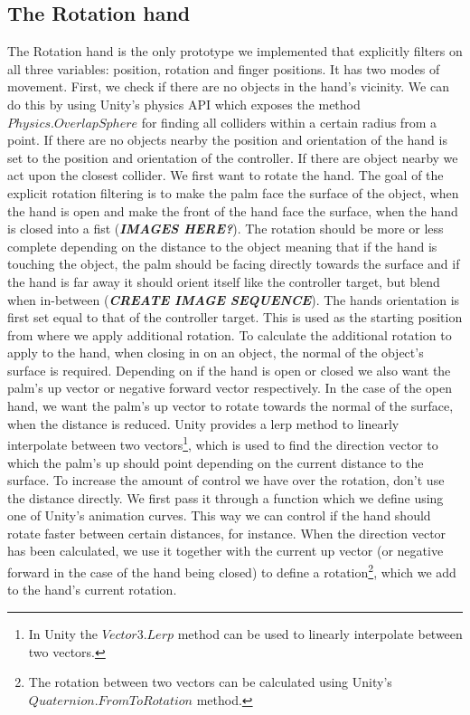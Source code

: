 
\subsection{The Rotation hand}
\label{subsec:slidingRigidHand}
The Rotation hand is the only prototype we implemented that explicitly filters on all three variables: position, rotation and finger positions. It has two modes of movement. First, we check if there are no objects in the hand's vicinity. We can do this by using Unity's physics API which exposes the method $Physics.OverlapSphere$ for finding all colliders within a certain radius from a point. If there are no objects nearby the position and orientation of the hand is set to the position and orientation of the controller. If there are object nearby we act upon the closest collider. We first want to rotate the hand. The goal of the explicit rotation filtering is to make the palm face the surface of the object, when the hand is open and make the front of the hand face the surface, when the hand is closed into a fist (\textbf{\textit{IMAGES HERE?}}). The rotation should be more or less complete depending on the distance to the object meaning that if the hand is touching the object, the palm should be facing directly towards the surface and if the hand is far away it should orient itself like the controller target, but blend when in-between (\textbf{\textit{CREATE IMAGE SEQUENCE}}). The hands orientation is first set equal to that of the controller target. This is used as the starting position from where we apply additional rotation. To calculate the additional rotation to apply to the hand, when closing in on an object, the normal of the object's surface is required. Depending on if the hand is open or closed we also want the palm's up vector or negative forward vector respectively. In the case of the open hand, we want the palm's up vector to rotate towards the normal of the surface, when the distance is reduced. Unity provides a lerp method to linearly interpolate between two vectors\footnote{In Unity the $Vector3.Lerp$ method can be used to linearly interpolate between two vectors.}, which is used to find the direction vector to which the palm's up should point depending on the current distance to the surface. To increase the amount of control we have over the rotation, don't use the distance directly. We first pass it through a function which we define using one of Unity's animation curves. This way we can control if the hand should rotate faster between certain distances, for instance. When the direction vector has been calculated, we use it together with the current up vector (or negative forward in the case of the hand being closed) to define a rotation\footnote{The rotation between two vectors can be calculated using Unity's $Quaternion.FromToRotation$ method.}, which we add to the hand's current rotation.

